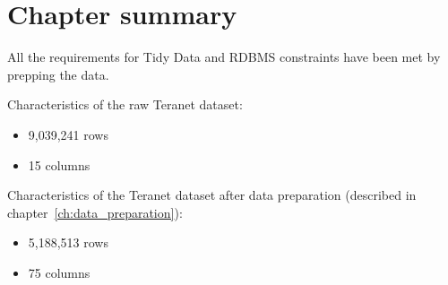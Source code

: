 \section{Chapter summary} \label{sec:data_preparation_summary}

All the requirements for Tidy Data and RDBMS constraints have been met by prepping the data.

Characteristics of the raw Teranet dataset:
\begin{itemize}
    \item 9,039,241 rows
    \item 15 columns
\end{itemize}

Characteristics of the Teranet dataset after data preparation (described in chapter~\ref{ch:data_preparation}):
\begin{itemize}
    \item 5,188,513 rows
    \item 75 columns
\end{itemize}
